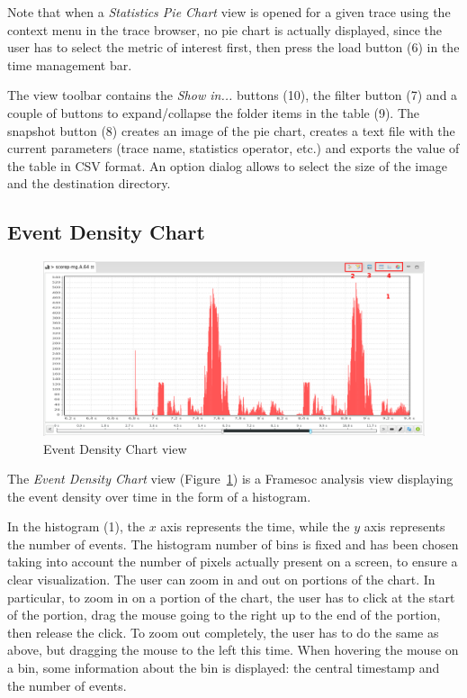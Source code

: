 \documentclass[twoside]{article}
\begin{document}
\begin{sloppypar}
Note that when a \emph{Statistics Pie Chart} view is opened for a given trace using the context menu in the trace browser, no pie chart is actually displayed, since the user has to select the metric of interest first, then press the load button (\num{6}) in the time management bar.

The view toolbar contains the \emph{Show in...} buttons (\num{10}), the filter button (\num{7}) and a couple of buttons to expand/collapse the folder items in the table (\num{9}).
The snapshot button (\num{8}) creates an image of the pie chart, creates a text file with the current parameters (trace name, statistics operator, etc.) and exports the value of the table in CSV format.
An option dialog allows to select the size of the image and the destination directory.

\subsection{Event Density Chart}
\label{subsec:histogram}

\begin{figure}[h!]
  \centering
    \includegraphics[width=1.0\textwidth]{images/histogram.png}
  \caption{Event Density Chart view}
  \label{fig:histogram}
\end{figure}

The \emph{Event Density Chart} view (Figure~\ref{fig:histogram}) is a Framesoc analysis view displaying the event density over time in the form of a histogram.

In the histogram (\num{1}), the $x$ axis represents the time, while the $y$ axis represents the number of events.
The histogram number of bins is fixed and has been chosen taking into account the number of pixels actually present on a screen, to ensure a clear visualization. 
The user can zoom in and out on portions of the chart.
In particular, to zoom in on a portion of the chart, the user has to click at the start of the portion, drag the mouse going to the right up to the end of the portion, then release the click.
To zoom out completely, the user has to do the same as above, but dragging the mouse to the left this time.
When hovering the mouse on a bin, some information about the bin is displayed: the central timestamp and the number of events.


\end{sloppypar}
\end{document}
